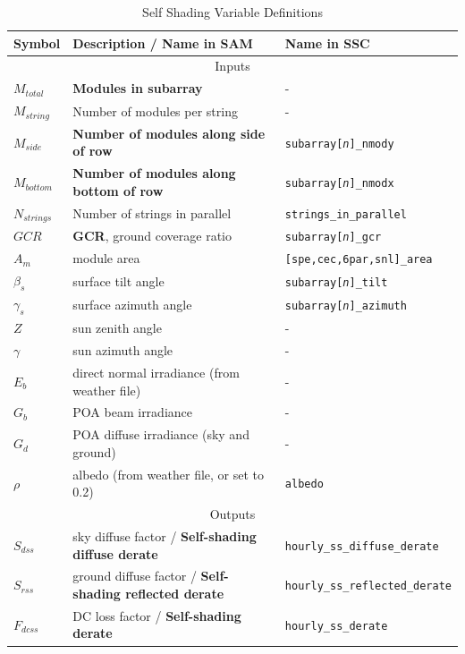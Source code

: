 \documentclass[12pt,letterpaper]{article}
\newcommand\GCR{\ensuremath{\mathit{GCR}}}
\begin{document}
\begin{table}
\begin{center}
\caption{Self Shading Variable Definitions}
\begin{tabular}{lll}
\midrule
Symbol & Description / \textbf{Name in SAM} & Name in SSC\\
\midrule
\multicolumn{3}{c}{Inputs}\\
$M_{total}$ & \textbf{Modules in subarray} & -\\
$M_{string}$ & Number of modules per string & -\\
$M_{side}$ & \textbf{Number of modules along side of row} & \texttt{subarray[\textit{n}]\_nmody}\\
$M_{bottom}$ & \textbf{Number of modules along bottom of row} & \texttt{subarray[\textit{n}]\_nmodx}\\
$N_{strings}$ & Number of strings in parallel & \texttt{strings\_in\_parallel}\\
$\GCR$ & \textbf{GCR}, ground coverage ratio & \texttt{subarray[\textit{n}]\_gcr}\\
$A_m$ & module area & \texttt{[spe,cec,6par,snl]\_area}\\
$\beta_s$ & surface tilt angle & \texttt{subarray[\textit{n}]\_tilt} \\
$\gamma_s$ & surface azimuth angle & \texttt{subarray[\textit{n}]\_azimuth} \\
$Z$ & sun zenith angle & -\\
$\gamma$ & sun azimuth angle & - \\
$E_b$ & direct normal irradiance (from weather file) & - \\
$G_b$ & POA beam irradiance & - \\
$G_d$ & POA diffuse irradiance (sky and ground) & - \\
$\rho$ & albedo (from weather file, or set to 0.2) & \texttt{albedo} \\
\midrule
\multicolumn{3}{c}{Outputs}\\
$S_{dss}$ & sky diffuse factor  / \textbf{Self-shading diffuse derate}& \texttt{hourly\_ss\_diffuse\_derate}\\
$S_{rss}$ & ground diffuse factor  / \textbf{Self-shading reflected derate}& \texttt{hourly\_ss\_reflected\_derate}\\
$F_{dcss}$& DC loss factor / \textbf{Self-shading derate} & \texttt{hourly\_ss\_derate}\\
\end{tabular}
\label{tab-selfshadinputs}
\end{center}
\end{table}
\end{document}
